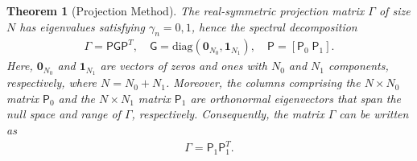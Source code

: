 \documentclass[english,12pt,jmp,graphicx]{revtex4-1}
\newtheorem{theorem}{Theorem}
\newcommand{\Pm}{\mathsf{P}}
\newcommand{\Gm}{\mathsf{G}}
\begin{document}
%
\begin{theorem}[Projection Method] \label{thm:Projection_Method}
The real-symmetric projection matrix $\Gamma$ of size $N$ has
eigenvalues satisfying $\gamma_n=0,1$, hence the spectral decomposition
%
\begin{align}\label{eq:Gamma_spec_decomp}
\Gamma=\Pm\Gm\Pm^T,
\quad
\Gm=\text{diag}(\mathbf{0}_{N_0},\mathbf{1}_{N_1}),
\quad
\Pm=[\Pm_0\;\Pm_1].
\end{align}
%
Here, $\mathbf{0}_{N_0}$ and $\mathbf{1}_{N_1}$ are vectors of zeros
and ones with $N_0$ and $N_1$ components, respectively, where
$N=N_0+N_1$. Moreover, the columns comprising the $N\times N_0$ matrix
$\Pm_0$ and 
the $N\times N_1$ matrix $\Pm_1$ are orthonormal eigenvectors that
span the null space and range of $\Gamma$, respectively. Consequently, 
the matrix $\Gamma$ can be written as
%
\begin{align}\label{eq:Eig_Decomp_Gamma}
  \Gamma=\Pm_1\Pm_1^T.
\end{align}
%




\end{theorem}
\end{document}
